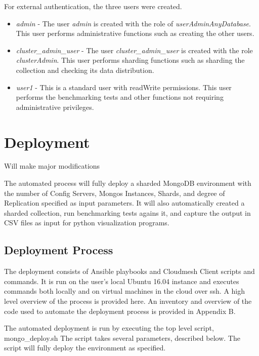 \documentclass[9pt,twocolumn,twoside]{../../styles/osajnl}
\begin{document}
For external authentication, the three users were created.

\vspace{-\topsep}
\begin{itemize}
\item \emph{admin} - The user \emph{admin} is created with the role of \emph{userAdminAnyDatabase}.  This user performs administrative functions such as creating the other users.
\item \emph{cluster\_admin\_user} - The user \emph{cluster\_admin\_user} is created with the role \emph{clusterAdmin}. This user performs sharding functions such as sharding the collection and checking its data distribution.
\item \emph{user1} - This is a standard user with readWrite permissions.  This user performs the benchmarking tests and other functions not requiring administrative privileges.
\end{itemize}
\vspace{-\topsep}


\section{Deployment}

Will make major modifications

The automated process will fully deploy a sharded MongoDB environment with the number of Config Servers, Mongos Instances, Shards, and degree of Replication specified as input parameters.  It will also automatically created a sharded collection, run benchmarking tests agains it, and capture the output in CSV files as input for python visualization programs.

\subsection{Deployment Process}

The deployment consists of Ansible playbooks and Cloudmesh Client scripts and commands.  It is run on the user's local Ubuntu 16.04 instance and executes commands both locally and on virtual machines in the cloud over ssh.  A high level overview of the process is provided here.  An inventory and overview of the code used to automate the deployment process is provided in Appendix B.

The automated deployment is run by executing the top level script, mongo\_deploy.sh \cite{www-mongoDeploy} \cite{www-shardLocal} The script takes several parameters, described below.  The script will fully deploy the environment as specified.
\end{document}
